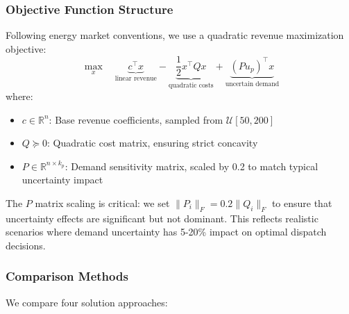 \subsubsection{Objective Function Structure}

Following energy market conventions, we use a quadratic revenue maximization objective:
\begin{equation}
\max_{x} \quad \underbrace{c^\top x}_{\text{linear revenue}} - \underbrace{\frac{1}{2} x^\top Q x}_{\text{quadratic costs}} + \underbrace{(P u_p)^\top x}_{\text{uncertain demand}}
\end{equation}
where:
\begin{itemize}
    \item $c \in \mathbb{R}^n$: Base revenue coefficients, sampled from $\mathcal{U}[50, 200]$
    \item $Q \succeq 0$: Quadratic cost matrix, ensuring strict concavity
    \item $P \in \mathbb{R}^{n \times k_p}$: Demand sensitivity matrix, scaled by 0.2 to match typical uncertainty impact
\end{itemize}

The $P$ matrix scaling is critical: we set $\|P_i\|_F = 0.2 \|Q_i\|_F$ to ensure that uncertainty effects are significant but not dominant. This reflects realistic scenarios where demand uncertainty has 5-20\% impact on optimal dispatch decisions.

\subsubsection{Comparison Methods}

We compare four solution approaches:

